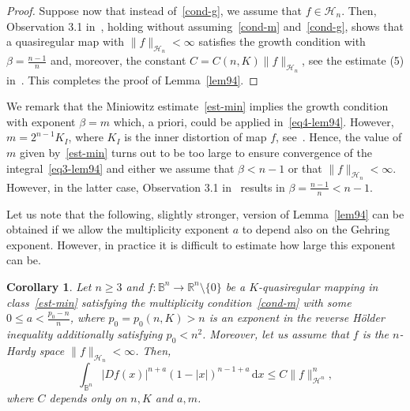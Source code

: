 \documentclass[11pt,a4paper,reqno]{amsart}
\newtheorem{cor}[theorem]{Corollary}
\theoremstyle{definition}
\newcommand{\B}{\mathbb{B}^n}
\newcommand{\Rn}{{\mathbb R}^n}
\newcommand{\ud}{\mathrm {d}}
\numberwithin{komcounter}{section}
\begin{document}
\begin{proof}
Suppose now that instead of~\eqref{cond-g}, we assume that $f\in \mathcal{H}_n$. Then, Observation 3.1 in~\cite{ag2}, holding without assuming~\eqref{cond-m} and~\eqref{cond-g}, shows that a quasiregular map with $\|f\|_{\mathcal{H}_n}<\infty$ satisfies the growth condition with $\beta=\frac{n-1}{n}$ and, moreover, the constant $C=C(n, K) \|f\|_{\mathcal{H}_n}$, see the estimate (5) in~\cite{ag2}. This completes the proof of Lemma~\ref{lem94}.
\end{proof}

We remark that the Miniowitz estimate~\eqref{est-min} implies the growth condition with exponent $\beta=m$ which, a priori, could be applied in~\eqref{eq4-lem94}. However, $m=2^{n-1}K_I$, where $K_I$ is the inner distortion of map $f$, see~\cite[Theorem 3]{M1}. Hence, the value of $m$ given by~\eqref{est-min} turns out to be too large to ensure convergence of the integral~\eqref{eq3-lem94} and either we assume that $\beta<n-1$ or that $\|f\|_{\mathcal{H}_n}<\infty$.  However, in the latter case, Observation 3.1 in~\cite{ag2} results in $\beta=\frac{n-1}{n}<n-1$.

Let us note that the following, slightly stronger, version of Lemma~\ref{lem94} can be obtained if we allow the multiplicity exponent $a$ to depend also on the Gehring exponent. However, in practice it is difficult to estimate how large this exponent can be. 

\begin{cor}\label{cor94}
 Let $n \geq 3$ and $f: \B\to \Rn \setminus \{0\}$ be a $K$-quasiregular mapping in class~\eqref{est-min} satisfying the multiplicity condition~\eqref{cond-m} with some $0\leq a<\frac{p_0-n}{n}$, where $p_0=p_0(n, K)>n$ is an exponent in the reverse H\"older inequality additionally satisfying $p_0<n^2$. Moreover, let us assume that $f$ is the $n$-Hardy space $\|f\|_{\mathcal{H}_n}<\infty$.
  Then,
 \[
  \int_{\B}|Df(x)|^{n+a}(1-|x|)^{n-1+a}\,\ud x\leq C \|f\|_{\mathcal{H}^n}^n,
 \]
 where $C$ depends only on $n, K$ and $a, m$. 
\end{cor}
\end{document}
